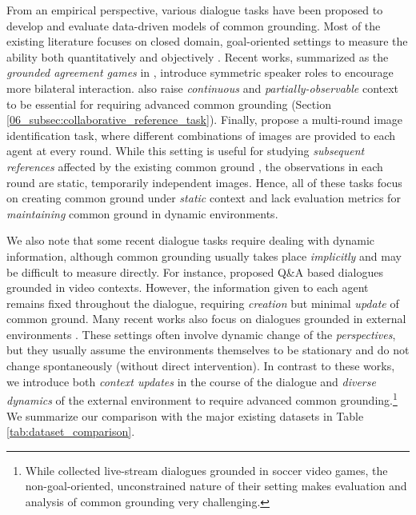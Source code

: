 From an empirical perspective, various dialogue tasks have been proposed to develop and evaluate data-driven models of common grounding. Most of the existing literature focuses on closed domain, goal-oriented settings to measure the ability both quantitatively and objectively \citep{fang2015embodied,zarriess-etal-2016-pentoref,de2017guesswhat}. Recent works, summarized as the \textit{grounded agreement games} in \citet{schlangen2019grounded}, introduce symmetric speaker roles to encourage more bilateral interaction. \citet{udagawa2019natural} also raise \textit{continuous} and \textit{partially-observable} context to be essential for requiring advanced common grounding (Section \ref{06_subsec:collaborative_reference_task}). Finally, \citet{haber-etal-2019-photobook} propose a multi-round image identification task, where different combinations of images are provided to each agent at every round. While this setting is useful for studying \textit{subsequent references} affected by the existing common ground \citep{Brennan1996ConceptualPA,takmaz-etal-2020-refer}, the observations in each round are static, temporarily independent images. Hence, all of these tasks focus on creating common ground under \textit{static} context and lack evaluation metrics for \textit{maintaining} common ground in dynamic environments.

We also note that some recent dialogue tasks require dealing with dynamic information, although common grounding usually takes place \textit{implicitly} and may be difficult to measure directly. For instance, \citet{alamri2019audio} proposed Q\&A based dialogues grounded in video contexts. However, the information given to each agent remains fixed throughout the dialogue, requiring \textit{creation} but minimal \textit{update} of common ground. Many recent works also focus on dialogues grounded in external environments \citep{de2018talk,suhr-etal-2019-executing,narayan-chen-etal-2019-collaborative,thomason:corl19,moon-etal-2020-situated}. These settings often involve dynamic change of the \textit{perspectives}, but they usually assume the environments themselves to be stationary and do not change spontaneously (without direct intervention). In contrast to these works, we introduce both \textit{context updates} in the course of the dialogue and \textit{diverse dynamics} of the external environment to require advanced common grounding.\footnote{While \citet{pasunuru-bansal-2018-game} collected live-stream dialogues grounded in soccer video games, the non-goal-oriented, unconstrained nature of their setting makes evaluation and analysis of common grounding very challenging.} We summarize our comparison with the major existing datasets in Table \ref{tab:dataset_comparison}.

